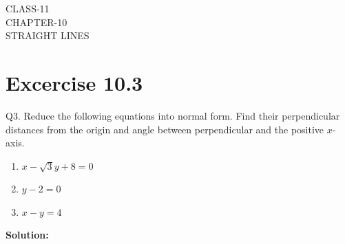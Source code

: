 \documentclass[12pt]{article}
\newcommand{\solution}{\noindent \textbf{Solution: }}
\begin{document}
\begin{center}
\textbf\large{CLASS-11 \\ CHAPTER-10 \\ STRAIGHT LINES}
\end{center}
\section*{Excercise 10.3}

Q3. Reduce the following equations into normal form. Find their perpendicular distances from the origin and angle between perpendicular and the positive $x$-axis.
\begin{enumerate}
	\item $x-\sqrt{3}y+8=0$ 
	\item $y-2=0$
	\item $x-y=4$
\end{enumerate}
\solution
\fi
\end{document}
